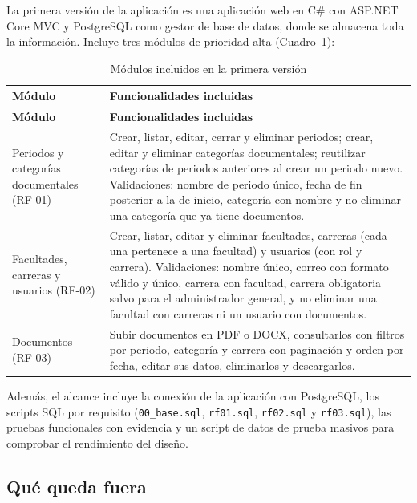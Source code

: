 \documentclass[12pt,a4paper,oneside]{article}
\begin{document}
La primera versión de la aplicación es una aplicación web en C\# con ASP.NET Core MVC
y PostgreSQL como gestor de base de datos, donde se almacena toda la información. Incluye
tres módulos de prioridad alta (Cuadro~\ref{tab:modulos}):

\begin{longtable}{>{\raggedright\arraybackslash}p{3.7cm}>{\raggedright\arraybackslash}p{11.3cm}}
\caption{Módulos incluidos en la primera versión}\label{tab:modulos}\\
\toprule
\textbf{Módulo} & \textbf{Funcionalidades incluidas} \\
\midrule
\endfirsthead
\toprule
\textbf{Módulo} & \textbf{Funcionalidades incluidas} \\
\midrule
\endhead
Periodos y categorías documentales (RF-01) &
Crear, listar, editar, cerrar y eliminar periodos; crear, editar y eliminar categorías
documentales; reutilizar categorías de periodos anteriores al crear un periodo nuevo.
Validaciones: nombre de periodo único, fecha de fin posterior a la de inicio, categoría
con nombre y no eliminar una categoría que ya tiene documentos. \\
\addlinespace
Facultades, carreras y usuarios (RF-02) &
Crear, listar, editar y eliminar facultades, carreras (cada una pertenece a una facultad)
y usuarios (con rol y carrera). Validaciones: nombre único, correo con formato válido y
único, carrera con facultad, carrera obligatoria salvo para el administrador general, y
no eliminar una facultad con carreras ni un usuario con documentos. \\
\addlinespace
Documentos (RF-03) &
Subir documentos en PDF o DOCX, consultarlos con filtros por periodo, categoría y carrera
con paginación y orden por fecha, editar sus datos, eliminarlos y descargarlos. \\
\bottomrule
\end{longtable}

Además, el alcance incluye la conexión de la aplicación con PostgreSQL, los scripts SQL
por requisito (\texttt{00\_base.sql}, \texttt{rf01.sql}, \texttt{rf02.sql} y
\texttt{rf03.sql}), las pruebas funcionales con evidencia y un script de datos de prueba
masivos para comprobar el rendimiento del diseño.

\subsection{Qué queda fuera}
\end{document}

